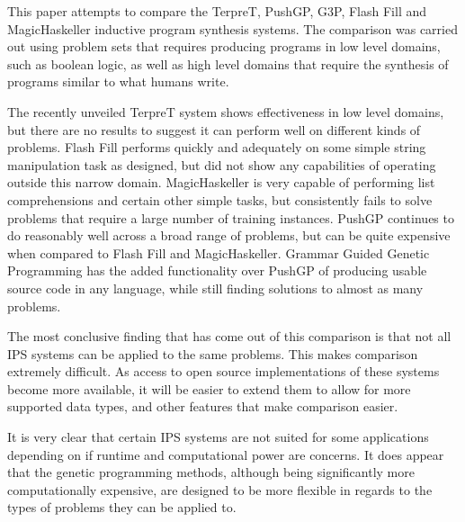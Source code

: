This paper attempts to compare the TerpreT, PushGP, G3P, Flash Fill and MagicHaskeller inductive program synthesis systems. The comparison was carried out using problem sets that requires producing programs in low level domains, such as boolean logic, as well as high level domains that require the synthesis of programs similar to what humans write.

The recently unveiled TerpreT system shows effectiveness in low level domains, but there are no results to suggest it can perform well on different kinds of problems. Flash Fill performs quickly and adequately on some simple string manipulation task as designed, but did not show any capabilities of operating outside this narrow domain. MagicHaskeller is very capable of performing list comprehensions and certain other simple tasks, but consistently fails to solve problems that require a large number of training instances. PushGP continues to do reasonably well across a broad range of problems, but can be quite expensive when compared to Flash Fill and MagicHaskeller. Grammar Guided Genetic Programming has the added functionality over PushGP of producing usable source code in any language, while still finding solutions to almost as many problems.

The most conclusive finding that has come out of this comparison is that not all IPS systems can be applied to the same problems. This makes comparison extremely difficult. As access to open source implementations of these systems become more available, it will be easier to extend them to allow for more supported data types, and other features that make comparison easier.

It is very clear that certain IPS systems are not suited for some applications depending on if runtime and computational power are concerns. It does appear that the genetic programming methods, although being significantly more computationally expensive, are designed to be more flexible in regards to the types of problems they can be applied to.

